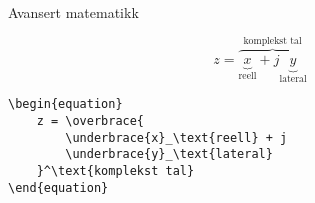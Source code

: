 \begin{frame}[containsverbatim]{Avansert matematikk}
	
	\begin{equation}
		z = \overbrace{
			\underbrace{x}_\text{reell} + j
			\underbrace{y}_\text{lateral}
		}^\text{komplekst tal}
	\end{equation}
	
	\begin{verbatim}
\begin{equation}
	z = \overbrace{
		\underbrace{x}_\text{reell} + j
		\underbrace{y}_\text{lateral}
	}^\text{komplekst tal}
\end{equation}
	\end{verbatim}
	
\end{frame}
